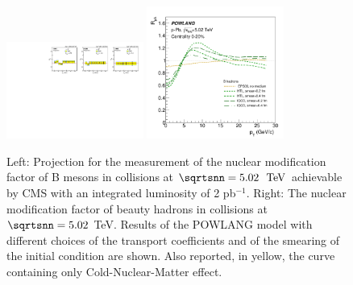 \begin{figure}[ht]
\centering
\includegraphics[trim=0 0 13cm 0,clip,width=0.4\textwidth]{hf/figures/cRpA_lumiTG_2000.pdf}
\includegraphics[width=0.4\textwidth]{hf/figures/Beauty-RpPb5TeV-HTLvsLat.pdf}
\caption{Left: Projection for the measurement of the nuclear modification factor of B mesons in \pPb collisions at $\sqrtsnn=5.02~\UTeV$ achievable by CMS with an integrated luminosity of 2 pb$^{-1}$.
Right: The nuclear modification factor of beauty hadrons in \pPb collisions at $\sqrtsnn=5.02$ TeV. Results of the POWLANG model with different choices of the transport coefficients and of the smearing of the initial condition are shown. Also reported, in yellow, the curve containing only Cold-Nuclear-Matter effect.}
\label{fig:POWLANG-small1}
\end{figure}
